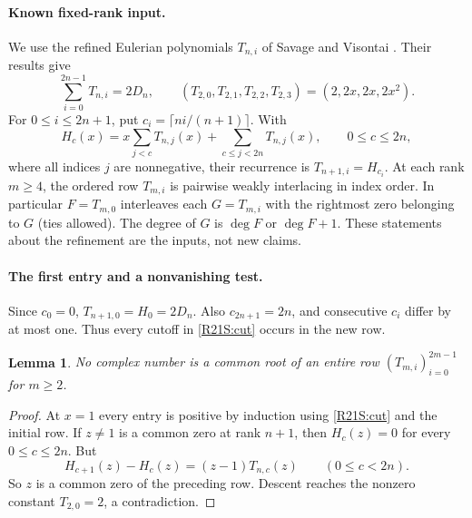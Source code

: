 \documentclass[11pt,a4paper]{article}
\newtheorem{SourceRcbSlemma}[SourceRcbStheorem]{Lemma}
\begin{document}
\paragraph{Known fixed-rank input.}
We use the refined Eulerian polynomials $T_{n,i}$ of Savage and Visontai
\cite[Secs.~4--5 and proof of Thm.~7.1]{R21S:sv}. Their results give
\[
 \sum_{i=0}^{2n-1}T_{n,i}=2D_n,\qquad
 (T_{2,0},T_{2,1},T_{2,2},T_{2,3})=(2,2x,2x,2x^2).
\]
For $0\le i\le2n+1$, put $c_i=\lceil ni/(n+1)\rceil$. With
\begin{equation}\label{R21S:cut}
 H_c(x)=x\sum_{j<c}T_{n,j}(x)+\sum_{c\le j<2n}T_{n,j}(x),
 \qquad 0\le c\le2n,
\end{equation}
where all indices $j$ are nonnegative, their recurrence is $T_{n+1,i}=H_{c_i}$. At each rank $m\ge4$, the ordered row $T_{m,i}$ is pairwise weakly interlacing in index order. In particular $F=T_{m,0}$ interleaves each $G=T_{m,i}$ with the rightmost zero belonging to $G$ (ties allowed). The degree of $G$ is $\deg F$ or $\deg F+1$. These statements about the refinement are the inputs, not new claims.


\paragraph{The first entry and a nonvanishing test.}
Since $c_0=0$, $T_{n+1,0}=H_0=2D_n$. Also $c_{2n+1}=2n$, and consecutive $c_i$ differ by at most one. Thus every cutoff in \eqref{R21S:cut} occurs in the new row.
\begin{SourceRcbSlemma}\label{R21S:noc}
No complex number is a common root of an entire row $(T_{m,i})_{i=0}^{2m-1}$ for $m\ge2$.
\end{SourceRcbSlemma}
\begin{proof}
At $x=1$ every entry is positive by induction using \eqref{R21S:cut} and the initial row. If $z\ne1$ is a common zero at rank $n+1$, then $H_c(z)=0$ for every $0\le c\le2n$. But
\[
 H_{c+1}(z)-H_c(z)=(z-1)T_{n,c}(z)\qquad(0\le c<2n).
\]
So $z$ is a common zero of the preceding row. Descent reaches the nonzero constant $T_{2,0}=2$, a contradiction.
\end{proof}
\end{document}

